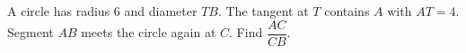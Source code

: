 A circle has radius $6$ and diameter $TB$. The tangent at $T$ contains $A$ with $AT=4$. Segment $AB$ meets the circle again at $C$. Find $\dfrac{AC}{CB}$.
